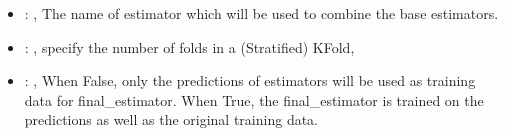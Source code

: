 \begin{itemize}
    \item {}: , 
      The name of estimator which will be used to combine the base estimators.

    \item {}: , 
      specify the number of folds in a (Stratified) KFold,

    \item {}: , 
      When False, only the predictions of estimators will be used as training
      data for final\_estimator. When True, the final\_estimator is trained on the predictions
      as well as the original training data.
  \end{itemize}
